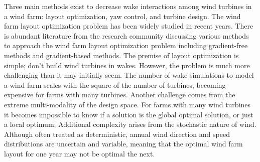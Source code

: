 Three main methods exist to decrease wake interactions among wind turbines in a wind farm: layout optimization, yaw control, and turbine design. The wind farm layout optimization problem has been widely studied in recent years. There is abundant literature from the research community discussing various methods to approach the wind farm layout optimization problem including gradient-free methods \cite{marmidis2008optimal,emami2010new,kusiak2010design,ituarte2011optimization,feng2015solving,gao2015wind} and gradient-based methods\cite{perez2013offshore,park2015layout,guirguis2016toward,Ning2016a}. The premise of layout optimization is simple; don't build wind turbines in wakes. %
However, the problem is much more challenging than it may initially seem.
The number of wake simulations to model a wind farm scales with the square of the number of turbines, becoming expensive for farms with many turbines. Another challenge comes from the extreme multi-modality of the design space. For farms with many wind turbines it becomes impossible to know if a solution is the global optimal solution, or just a local optimum.  Additional complexity arises from the stochastic nature of wind. Although often treated as deterministic, annual wind direction and speed distributions are uncertain and variable, meaning that the optimal wind farm layout for one year may not be optimal the next.




